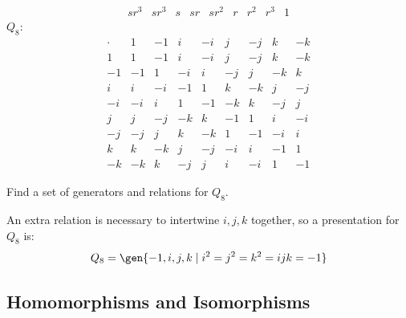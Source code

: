 \begin{problems}
\begin{sol}
\[\begin{array}{c|c|c|c|c|c|c|c|c}
            sr^3 & sr^3 & s & sr & sr^2 & r & r^2 & r^3 & 1
        \end{array}\]
        $Q_8$:
        \[\begin{array}{c|c|c|c|c|c|c|c|c}
            \cdot & 1 & -1 & i & -i & j & -j & k & -k \\
            \hline
            1 & 1 & -1 & i & -i & j & -j & k & -k \\
            -1 & -1 & 1 & -i & i & -j & j & -k & k \\
            i & i & -i & -1 & 1 & k & -k & j & -j \\
            -i & -i & i & 1 & -1 & -k & k & -j & j \\
            j & j & -j & -k & k & -1 & 1 & i & -i \\
            -j & -j & j & k & -k & 1 & -1 & -i & i \\
            k & k & -k & j & -j & -i & i & -1 & 1 \\
            -k & -k & k & -j & j & i & -i & 1 & -1
        \end{array}\]
    \end{sol}
    \item Find a set of generators and relations for $Q_8$.
    \label{ex1.5.3}
    \begin{sol}
        An extra relation is necessary to intertwine $i, j, k$ together, so a presentation for $Q_8$ is:
        \[Q_8 = \gen{-1, i, j, k \mid i^2 = j^2 = k^2 = ijk = -1}\]
    \end{sol}
\end{problems}

\newpage

\subsection{Homomorphisms and Isomorphisms}

